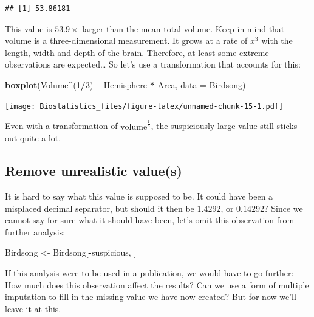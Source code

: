 \documentclass[
]{book}
\newenvironment{Shaded}{\begin{snugshade}}{\end{snugshade}}
\newcommand{\DataTypeTok}[1]{\textcolor[rgb]{0.13,0.29,0.53}{#1}}
\newcommand{\DecValTok}[1]{\textcolor[rgb]{0.00,0.00,0.81}{#1}}
\newcommand{\KeywordTok}[1]{\textcolor[rgb]{0.13,0.29,0.53}{\textbf{#1}}}
\newcommand{\NormalTok}[1]{#1}
\newcommand{\OperatorTok}[1]{\textcolor[rgb]{0.81,0.36,0.00}{\textbf{#1}}}
\newcommand{\StringTok}[1]{\textcolor[rgb]{0.31,0.60,0.02}{#1}}
\begin{document}
\begin{verbatim}
## [1] 53.86181
\end{verbatim}

This value is \(53.9 \times\) larger than the mean total volume. Keep in mind that volume is a three-dimensional measurement. It grows at a rate of \(x^3\) with the length, width and depth of the brain. Therefore, at least some extreme observations are expected\ldots{} So let's use a transformation that accounts for this:

\begin{Shaded}
\begin{Highlighting}[]
\KeywordTok{boxplot}\NormalTok{(Volume}\OperatorTok{^}\NormalTok{(}\DecValTok{1}\OperatorTok{/}\DecValTok{3}\NormalTok{) }\OperatorTok{~}\StringTok{ }\NormalTok{Hemisphere }\OperatorTok{*}\StringTok{ }\NormalTok{Area, }\DataTypeTok{data =}\NormalTok{ Birdsong)}
\end{Highlighting}
\end{Shaded}

\texttt{[image: Biostatistics\_files/figure-latex/unnamed-chunk-15-1.pdf]}

Even with a transformation of \(\text{volume}^\frac{1}{3}\), the suspiciously large value still sticks out quite a lot.

\hypertarget{remove-unrealistic-values}{%
\subsection{Remove unrealistic value(s)}\label{remove-unrealistic-values}}

It is hard to say what this value is supposed to be. It could have been a misplaced decimal separator, but should it then be \(1.4292\), or \(0.14292\)? Since we cannot say for sure what it should have been, let's omit this observation from further analysis:

\begin{Shaded}
\begin{Highlighting}[]
\NormalTok{Birdsong <-}\StringTok{ }\NormalTok{Birdsong[}\OperatorTok{-}\NormalTok{suspicious, ]}
\end{Highlighting}
\end{Shaded}

If this analysis were to be used in a publication, we would have to go further: How much does this observation affect the results? Can we use a form of multiple imputation to fill in the missing value we have now created? But for now we'll leave it at this.
\end{document}
